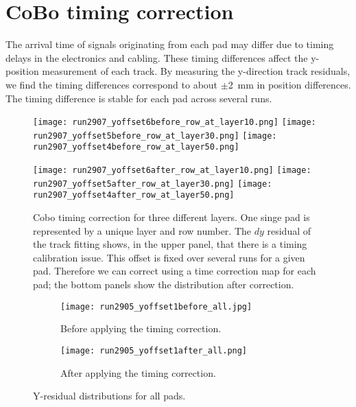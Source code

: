 \section{CoBo timing correction}
The arrival time of signals originating from each pad may differ due to timing delays in the electronics and cabling. These timing differences affect the y-position measurement of each track. By measuring the y-direction track residuals, we find the timing differences correspond to about $\pm$\SI{2}{\milli\metre} in position differences. The timing difference is stable for each pad across several runs. 

\begin{figure}[!htb]
  \begin{center}
    \texttt{[image: run2907\_yoffset6before\_row\_at\_layer10.png]}
    \texttt{[image: run2907\_yoffset5before\_row\_at\_layer30.png]}
    \texttt{[image: run2907\_yoffset4before\_row\_at\_layer50.png]}
 
    \texttt{[image: run2907\_yoffset6after\_row\_at\_layer10.png]}
    \texttt{[image: run2907\_yoffset5after\_row\_at\_layer30.png]}
    \texttt{[image: run2907\_yoffset4after\_row\_at\_layer50.png]}
 
  \end{center}
  \caption{Cobo timing correction for three different layers. One singe pad is represented by a unique layer and row number. The $dy$ residual of the track fitting shows, in the upper panel, that there is a timing calibration issue. This offset is fixed over several runs for a given pad. Therefore we can correct using a time correction map for each pad; the bottom panels show the distribution after correction. }
  \label{fig:coboCorr}
\end{figure}



\begin{figure}[!htb]
    \begin{subfigure}[t]{.49\textwidth}
        \centering
        \texttt{[image: run2905\_yoffset1before\_all.jpg]} 
        \caption{Before applying the timing correction.} \label{fig:yoff_allBefore}
    \end{subfigure}
    \hfill
    \begin{subfigure}[t]{.49\textwidth}
        \centering
        \texttt{[image: run2905\_yoffset1after\_all.png]}
        \caption{After applying the timing correction.} \label{fig:yoff_allAfter}
    \end{subfigure}
    \caption{Y-residual distributions for all pads.}
\label{fig:yoff}
\end{figure}


